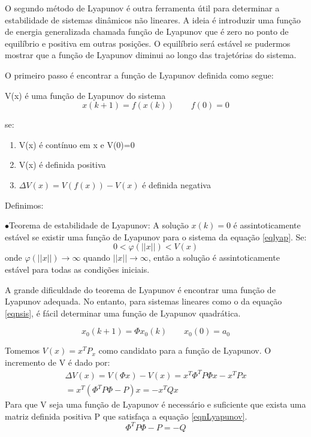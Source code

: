 O segundo método de Lyapunov é outra ferramenta útil para determinar a estabilidade de sistemas dinâmicos não lineares. A ideia é introduzir uma função de energia generalizada chamada função de Lyapunov que é zero no ponto de equilíbrio e positiva em outras posições. O equilíbrio será estável se pudermos mostrar que a função de Lyapunov diminui ao longo das trajetórias do sistema.


O primeiro passo é encontrar a função de Lyapunov definida como segue:


V(x) é uma função de Lyapunov do sistema
\begin{equation}\label{eqlyap}
x(k+1)=f(x(k)) \qquad f(0)=0
\end{equation}

se:
\begin{enumerate}
	\item V(x) é contínuo em x e V(0)=0
	\item V(x) é definida positiva
	\item $\Delta V(x)=V(f(x))-V(x)$ é definida negativa
\end{enumerate}

Definimos:


$\bullet$Teorema de estabilidade de Lyapunov: A solução $x(k)=0$ é assintoticamente estável se existir uma função de Lyapunov para o sistema da equação \ref{eqlyap}. Se:
\begin{equation}
0<\varphi(||x||)<V(x)
\end{equation}
onde $\varphi(||x||)\to \infty$ quando $||x|| \to \infty$, então a solução é assintoticamente estável para todas as condições iniciais.


A grande dificuldade do teorema de Lyapunov é encontrar uma função de Lyapunov adequada. No entanto, para sistemas lineares como o da equação \ref{eqnsis}, é fácil determinar uma função de Lyapunov quadrática.

\begin{equation} \label{eqnsis}
x_0(k+1)=\Phi x_0(k) \qquad x_0(0)=a_0
\end{equation}

Tomemos $V(x)=x^TP_x$ como candidato para a função de Lyapunov. O incremento de V é dado por:
\begin{equation}
\begin{array}{c}
\Delta V(x)=V(\Phi x)-V(x)=x^T\Phi ^T P \Phi x-x^TPx\\
=x^T(\Phi ^T P \Phi -P)x=-x^TQx
\end{array}
\end{equation}
Para que V seja uma função de Lyapunov é necessário e suficiente que exista uma matriz definida positiva P que satisfaça a equação \ref{eqnLyapunov}.
\begin{equation}\label{eqnLyapunov}
\Phi ^T P \Phi - P= -Q
\end{equation}






